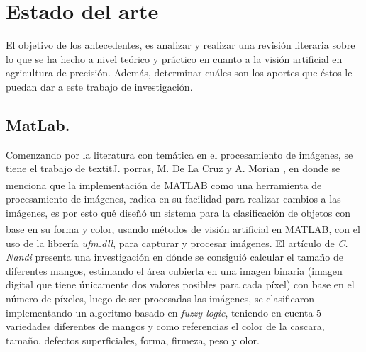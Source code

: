 \chapter{Estado del arte}

	El objetivo de los antecedentes, es analizar y realizar una revisión literaria sobre lo  que  se  ha hecho  a  nivel  teórico  y  práctico  en  cuanto a  la visión artificial en agricultura de precisión.  Además,  determinar  cuáles son los aportes que éstos le puedan dar a este trabajo de investigación.


\section{MatLab.}

	Comenzando por la literatura con temática en el procesamiento de imágenes, se tiene el trabajo de textit{J. porras, M. De La Cruz y A. Morian} \cite{article3}, en donde se menciona que la implementación de MATLAB\textsuperscript{\textregistered} como una herramienta de procesamiento de imágenes, radica en su facilidad para realizar cambios a las imágenes, es por esto qué diseñó un sistema para la clasificación de objetos con base en su forma y color, usando métodos de visión artificial en MATLAB\textsuperscript{\textregistered}, con el uso de la librería \textit{ufm.dll}, para capturar y procesar imágenes. El artículo de \textit{C. Nandi} \cite{inproceedings} presenta una investigación en dónde se consiguió calcular el tamaño de diferentes mangos, estimando el área cubierta en una imagen binaria (imagen digital que tiene únicamente dos valores posibles para cada píxel) con base en el número de píxeles, luego de ser procesadas las imágenes, se clasificaron implementando un algoritmo basado en \textit{fuzzy logic}, teniendo en cuenta 5 variedades diferentes de mangos y como referencias el color de la cascara, tamaño, defectos superficiales, forma, firmeza, peso y olor.\\

